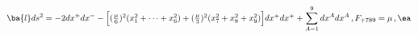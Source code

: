 \begin{equation}
\ba{l}ds^{2}=-2dx^{+}dx^{-}-\Big[(\textstyle{\frac{\mu}{6}})^{2}(x_{1}^{2} +\cdots+x_{6}^{2})+
(\textstyle{\frac{\mu}{3}})^{2}(x_{7}^{2}+x_{8}^{2}+x_{9}^{2})\Big]dx^{+}dx^{+}
+\displaystyle{\sum_{A=1}^{9}}\,dx^{A}dx^{A}\,,\\
{}\\
F_{+789}=\mu\,, \ea\label{pp-wave}
\end{equation}

